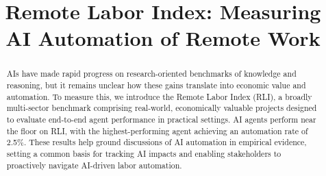 \title{Remote Labor Index: Measuring AI Automation of Remote Work}

\maketitle

\begin{abstract}
AIs have made rapid progress on research-oriented benchmarks of knowledge and reasoning, but it remains unclear how these gains translate into economic value and automation. To measure this, we introduce the Remote Labor Index (RLI), a broadly multi-sector benchmark comprising real-world, economically valuable projects designed to evaluate end-to-end agent performance in practical settings. AI agents perform near the floor on RLI, with the highest-performing agent achieving an automation rate of 2.5\%. These results help ground discussions of AI automation in empirical evidence, setting a common basis for tracking AI impacts and enabling stakeholders to proactively navigate AI-driven labor automation.
\end{abstract}

